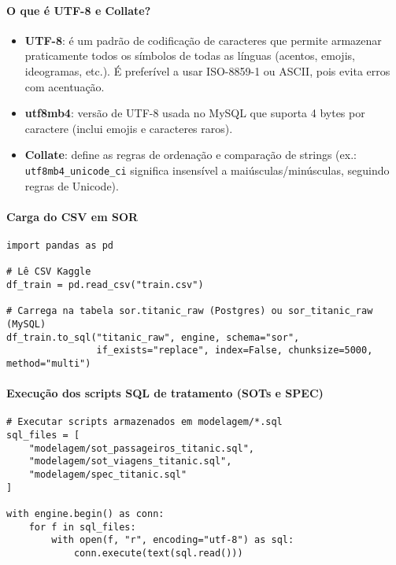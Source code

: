 \documentclass[12pt,a4paper]{article}
\begin{document}
\paragraph{O que é UTF-8 e Collate?}
\begin{itemize}
  \item \textbf{UTF-8}: é um padrão de codificação de caracteres que permite armazenar praticamente todos os símbolos de todas as línguas (acentos, emojis, ideogramas, etc.). É preferível a usar ISO-8859-1 ou ASCII, pois evita erros com acentuação.
  \item \textbf{utf8mb4}: versão de UTF-8 usada no MySQL que suporta 4 bytes por caractere (inclui emojis e caracteres raros).  
  \item \textbf{Collate}: define as regras de ordenação e comparação de strings (ex.: \texttt{utf8mb4\_unicode\_ci} significa insensível a maiúsculas/minúsculas, seguindo regras de Unicode).
\end{itemize}

\paragraph{Carga do CSV em SOR}
\begin{verbatim}
import pandas as pd

# Lê CSV Kaggle
df_train = pd.read_csv("train.csv")

# Carrega na tabela sor.titanic_raw (Postgres) ou sor_titanic_raw (MySQL)
df_train.to_sql("titanic_raw", engine, schema="sor", 
                if_exists="replace", index=False, chunksize=5000, method="multi")
\end{verbatim}

\paragraph{Execução dos scripts SQL de tratamento (SOTs e SPEC)}
\begin{verbatim}
# Executar scripts armazenados em modelagem/*.sql
sql_files = [
    "modelagem/sot_passageiros_titanic.sql",
    "modelagem/sot_viagens_titanic.sql",
    "modelagem/spec_titanic.sql"
]

with engine.begin() as conn:
    for f in sql_files:
        with open(f, "r", encoding="utf-8") as sql:
            conn.execute(text(sql.read()))
\end{verbatim}
\end{document}
